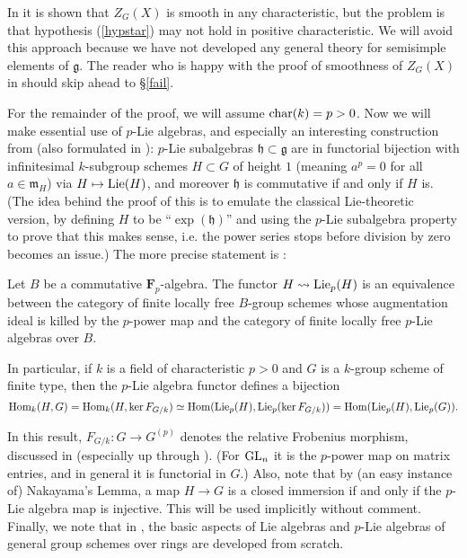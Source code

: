 \documentclass[10pt]{article}
\newcommand{\Hom}{\operatorname{Hom}}
\renewcommand{\(}{\left(}
\renewcommand{\)}{\right)}
\numberwithin{thm}{subsection}
\begin{document}
\begin{remark}
In \cite[\S9.1]{borel} it is shown that $Z_G(X)$ is smooth in any characteristic,
but the problem is that hypothesis (\ref{hypstar}) may not hold
in positive characteristic.  We will avoid this approach because
we have not developed any general theory for
semisimple elements of $\mathfrak{g}$.  The reader who is happy with
the proof of smoothness of $Z_G(X)$ in \cite[\S9.1]{borel} should skip ahead to \S\ref{fail}.
\end{remark} 

For the remainder of the proof, we will assume ${\rm{char}}(k) = p > 0$. 
Now we will make essential use of $p$-Lie algebras,
and especially an interesting construction from \cite[VII$_{\rm{A}}$, 7.2, 7.4]{sga3}
(also formulated in \cite[Prop.\,A.7.14]{pred}): 
$p$-Lie subalgebras $\mathfrak{h}\subset \mathfrak{g}$
are in functorial bijection with
infinitesimal $k$-subgroup schemes $H\subset G$
of height $1$ (meaning $a^p=0$ for all $a\in \mathfrak{m}_H$)
via $H \mapsto {\rm{Lie}}(H)$, 
and moreover $\mathfrak{h}$ is commutative if and only if $H$ is.
(The idea behind the proof of this
is to emulate the classical
Lie-theoretic version, by defining $H$ to be ``$\exp(\mathfrak{h})$'' and 
using the $p$-Lie subalgebra property
to prove that this makes sense, i.e. the power series stops
before division by zero becomes an issue.)
The more precise statement is \cite[VII$_{\rm{A}}$, 7.2, 7.4]{sga3}:

\begin{thm}\label{exp}
Let $B$ be a commutative $\mathbf{F}_p$-algebra.  The functor
$H \rightsquigarrow {\rm{Lie}}_p(H)$ is an equivalence between the category
of finite locally free $B$-group schemes whose augmentation ideal is killed
by the $p$-power map and the category of finite locally free $p$-Lie algebras over $B$.

In particular, if $k$ is a field of characteristic $p > 0$ and $G$ is a $k$-group scheme of finite type,
then the $p$-Lie algebra functor defines a bijection 
$$\Hom_k(H,G) = \Hom_k(H,\ker F_{G/k}) \simeq \Hom({\rm{Lie}}_p(H), {\rm{Lie}}_p(\ker F_{G/k})) =
\Hom({\rm{Lie}}_p(H), {\rm{Lie}}_p(G)).$$
\end{thm}

In this result, $F_{G/k}:G \rightarrow G^{(p)}$ denotes the relative
Frobenius morphism, discussed in \cite[A.3]{pred} (especially up through \cite[A.3.4]{pred}). 
(For ${\rm{GL}}_n$ it is the $p$-power map on matrix entries, and in general it is functorial in $G$.) 
Also, note that by (an easy instance of) Nakayama's Lemma, a map $H \rightarrow G$ is a closed immersion if
and only if the $p$-Lie algebra map is injective.  This will be used implicitly without comment. 
Finally, we note that in \cite[A.7]{pred}, the basic aspects
of Lie algebras and $p$-Lie algebras of general group schemes over rings are developed from scratch. 
\end{document}
